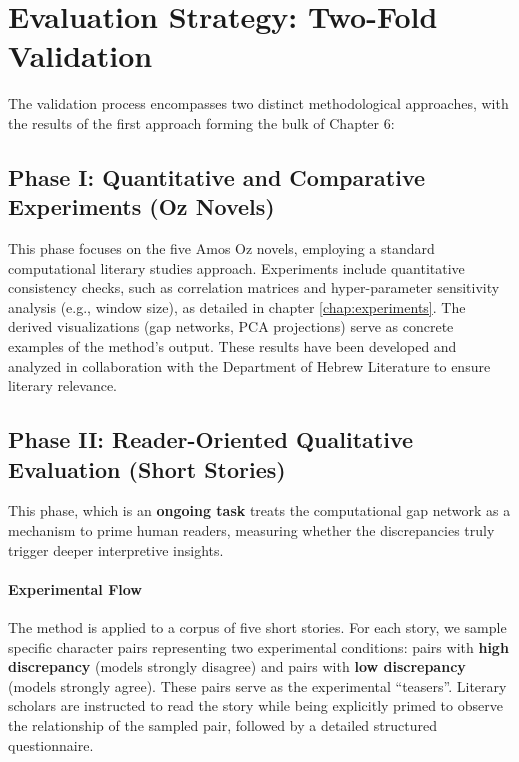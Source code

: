 \documentclass[a4paper,12pt]{report}
\begin{document}
\section{Evaluation Strategy: Two-Fold Validation}
\label{sec:evaluation_strategy}

The validation process encompasses two distinct methodological approaches, with the results of the first approach forming the bulk of Chapter 6:

\subsection{Phase I: Quantitative and Comparative Experiments (Oz Novels)}
This phase focuses on the five Amos Oz novels, employing a standard computational literary studies approach. Experiments include quantitative consistency checks, such as correlation matrices and hyper-parameter sensitivity analysis (e.g., window size), as detailed in chapter \ref{chap:experiments}. The derived visualizations (gap networks, PCA projections) serve as concrete examples of the method's output. These results have been developed and analyzed in collaboration with the Department of Hebrew Literature to ensure literary relevance.

\subsection{Phase II: Reader-Oriented Qualitative Evaluation (Short Stories)}
\label{sec:reader_oriented_evaluation}

This phase, which is an \textbf{ongoing task} treats the computational gap network as a mechanism to prime human readers, measuring whether the discrepancies truly trigger deeper interpretive insights.

\paragraph{Experimental Flow}
The method is applied to a corpus of five short stories. For each story, we sample specific character pairs representing two experimental conditions: pairs with \textbf{high discrepancy} (models strongly disagree) and pairs with \textbf{low discrepancy} (models strongly agree). These pairs serve as the experimental \textquotedblleft teasers\textquotedblright{}. Literary scholars are instructed to read the story while being explicitly primed to observe the relationship of the sampled pair, followed by a detailed structured questionnaire.
\end{document}
